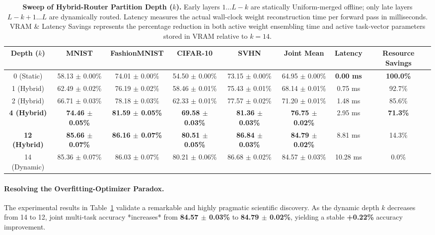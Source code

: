 \begin{table}[t]
\caption{\textbf{Sweep of Hybrid-Router Partition Depth ($k$).} Early layers $1 \dots L-k$ are statically Uniform-merged offline; only late layers $L-k+1 \dots L$ are dynamically routed. Latency measures the actual wall-clock weight reconstruction time per forward pass in milliseconds. VRAM \& Latency Savings represents the percentage reduction in both active weight ensembling time and active task-vector parameters stored in VRAM relative to $k=14$.}
\label{tab:sweeps}
\vskip 0.15in
\begin{center}
\begin{small}
\setlength{\tabcolsep}{1.8pt}
\begin{tabular}{cccccccc}
\toprule
Depth ($k$) & MNIST & FashionMNIST & CIFAR-10 & SVHN & Joint Mean & Latency & Resource Savings \\
\midrule
0 (Static) & 58.13 $\pm$ 0.00\% & 74.01 $\pm$ 0.00\% & 54.50 $\pm$ 0.00\% & 73.15 $\pm$ 0.00\% & 64.95 $\pm$ 0.00\% & \textbf{0.00 ms} & \textbf{100.0\%} \\
1 (Hybrid) & 62.49 $\pm$ 0.02\% & 76.19 $\pm$ 0.02\% & 58.46 $\pm$ 0.01\% & 75.43 $\pm$ 0.01\% & 68.14 $\pm$ 0.01\% & 0.75 ms & 92.7\% \\
2 (Hybrid) & 66.71 $\pm$ 0.03\% & 78.18 $\pm$ 0.03\% & 62.33 $\pm$ 0.01\% & 77.57 $\pm$ 0.02\% & 71.20 $\pm$ 0.01\% & 1.48 ms & 85.6\% \\
\textbf{4 (Hybrid)} & \textbf{74.46 $\pm$ 0.05\%} & \textbf{81.59 $\pm$ 0.05\%} & \textbf{69.58 $\pm$ 0.03\%} & \textbf{81.36 $\pm$ 0.03\%} & \textbf{76.75 $\pm$ 0.02\%} & 2.95 ms & \textbf{71.3\%} \\
\textbf{12 (Hybrid)} & \textbf{85.66 $\pm$ 0.07\%} & \textbf{86.16 $\pm$ 0.07\%} & \textbf{80.51 $\pm$ 0.05\%} & \textbf{86.84 $\pm$ 0.03\%} & \textbf{84.79 $\pm$ 0.02\%} & 8.81 ms & 14.3\% \\
14 (Dynamic) & 85.36 $\pm$ 0.07\% & 86.03 $\pm$ 0.07\% & 80.21 $\pm$ 0.06\% & 86.68 $\pm$ 0.02\% & 84.57 $\pm$ 0.03\% & 10.28 ms & 0.0\% \\
\bottomrule
\end{tabular}
\end{small}
\end{center}
\vskip -0.1in
\end{table}

\paragraph{Resolving the Overfitting-Optimizer Paradox.}
The experimental results in Table~\ref{tab:sweeps} validate a remarkable and highly pragmatic scientific discovery. As the dynamic depth $k$ decreases from 14 to 12, joint multi-task accuracy *increases* from \textbf{84.57 $\pm$ 0.03\%} to \textbf{84.79 $\pm$ 0.02\%}, yielding a stable \textbf{+0.22\%} accuracy improvement.

